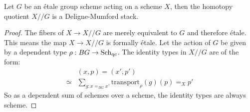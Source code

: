 \begin{proposition}
  Let $G$ be an étale group scheme acting on a scheme $X$,
  then the homotopy quotient $X//G$ is a Deligne-Mumford stack.
\end{proposition}

\begin{proof}
  The fibers of $X\to X//G$ are merely equivalent to $G$
  and therefore étale.
  This means the map $X\to X//G$ is formally étale.
  Let the action of $G$ be given by a dependent type
  $\rho:BG\to \operatorname{\mathrm{Sch}_{qc}}$.
  The identity types in $X//G$ are of the form:
  \begin{align*}
    &(x,p)=(x',p') \\
    \simeq& \sum_{g:x=_{BG}x'}\mathrm{transport}_{\rho}(g)(p)=_Xp'
  \end{align*}
  So as a dependent sum of schemes over a scheme,
  the identity types are always scheme. 
\end{proof}